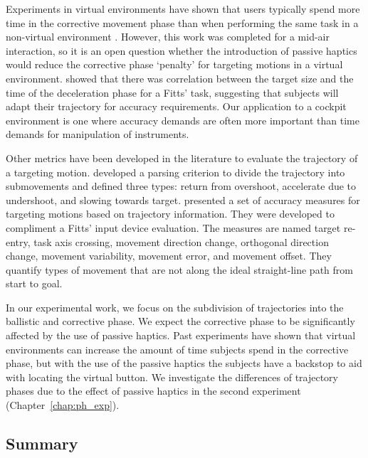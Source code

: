 Experiments in virtual environments have shown that users typically spend more time in the corrective movement phase than when performing the same task in a non-virtual environment \citep{liu_comparing_2009}.
However, this work was completed for a mid-air interaction, so it is an open question whether the introduction of passive haptics would reduce the corrective phase `penalty' for targeting motions in a virtual environment.
\citet{mackenzie_three-dimensional_1987} showed that there was correlation between the target size and the time of the deceleration phase for a Fitts' task, suggesting that subjects will adapt their trajectory for accuracy requirements.
Our application to a cockpit environment is one where accuracy demands are often more important than time demands for manipulation of instruments.

Other metrics have been developed in the literature to evaluate the trajectory of a targeting motion.
\citet{meyer_optimality_1988} developed a parsing criterion to divide the trajectory into submovements and defined three types: return from overshoot, accelerate due to undershoot, and slowing towards target.
\citet{mackenzie_accuracy_2001} presented a set of accuracy measures for targeting motions based on trajectory information.
They were developed to compliment a Fitts' input device evaluation.
The measures are named target re-entry, task axis crossing, movement direction change, orthogonal direction change, movement variability, movement error, and movement offset.
They quantify types of movement that are not along the ideal straight-line path from start to goal.

In our experimental work, we focus on the subdivision of trajectories into the ballistic and corrective phase.
We expect the corrective phase to be significantly affected by the use of passive haptics.
Past experiments have shown that virtual environments can increase the amount of time subjects spend in the corrective phase, but with the use of the passive haptics the subjects have a backstop to aid with locating the virtual button.
We investigate the differences of trajectory phases due to the effect of passive haptics in the second experiment (Chapter~\ref{chap:ph_exp}).

\subsection{Summary}
\label{summary}

